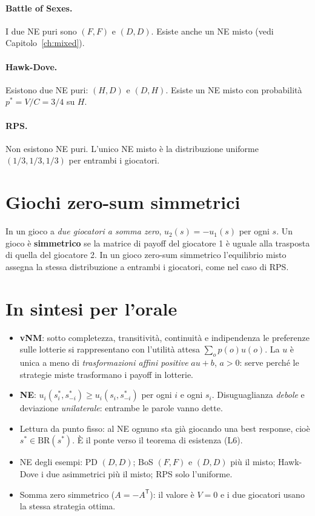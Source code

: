 \documentclass[12pt,a4paper,twoside]{book}
\theoremstyle{plain}
\theoremstyle{definition}
\newcommand{\BR}{\mathrm{BR}}
\begin{document}
\paragraph{Battle of Sexes.} I due NE puri sono $(F,F)$ e $(D,D)$. Esiste anche un NE misto (vedi Capitolo~\ref{ch:mixed}).

\paragraph{Hawk-Dove.} Esistono due NE puri: $(H,D)$ e $(D,H)$. Esiste un NE misto con probabilità $p^*=V/C=3/4$ su $H$.

\paragraph{RPS.} Non esistono NE puri. L'unico NE misto è la distribuzione uniforme $(1/3,1/3,1/3)$ per entrambi i giocatori.

\section{Giochi zero-sum simmetrici}

In un gioco a \emph{due giocatori a somma zero}, $u_2(s) = -u_1(s)$ per ogni $s$. Un gioco è \textbf{simmetrico} se la matrice di payoff del giocatore 1 è uguale alla trasposta di quella del giocatore 2. In un gioco zero-sum simmetrico l'equilibrio misto assegna la stessa distribuzione a entrambi i giocatori, come nel caso di RPS.

\section*{In sintesi per l'orale}
\begin{itemize}
  \item \textbf{vNM}: sotto completezza, transitività, continuità e indipendenza le preferenze sulle lotterie si rappresentano con l'utilità attesa $\sum_o p(o)u(o)$. La $u$ è unica a meno di \emph{trasformazioni affini positive} $au+b$, $a>0$: serve perché le strategie miste trasformano i payoff in lotterie.
  \item \textbf{NE}: $u_i(s_i^*,s_{-i}^*)\ge u_i(s_i,s_{-i}^*)$ per ogni $i$ e ogni $s_i$. Disuguaglianza \emph{debole} e deviazione \emph{unilaterale}: entrambe le parole vanno dette.
  \item Lettura da punto fisso: al NE ognuno sta già giocando una best response, cioè $s^*\in\BR(s^*)$. È il ponte verso il teorema di esistenza (L6).
  \item NE degli esempi: PD $(D,D)$; BoS $(F,F)$ e $(D,D)$ più il misto; Hawk-Dove i due asimmetrici più il misto; RPS solo l'uniforme.
  \item Somma zero simmetrico ($A=-A^{\mathsf T}$): il valore è $V=0$ e i due giocatori usano la stessa strategia ottima.
\end{itemize}
\end{document}

